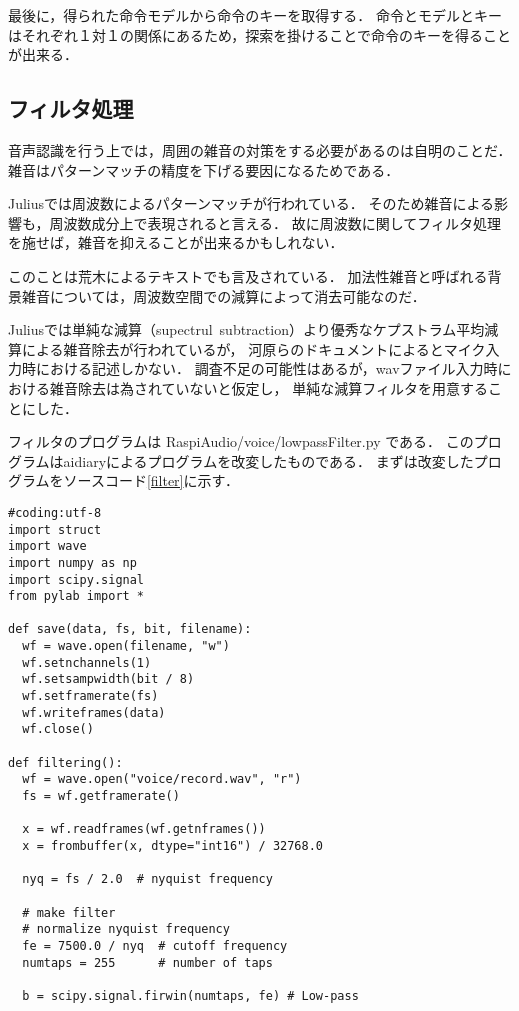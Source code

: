 \documentclass{jsarticle}
\begin{document}
\begin{multicols}{2}
最後に，得られた命令モデルから命令のキーを取得する．
命令とモデルとキーはそれぞれ１対１の関係にあるため，探索を掛けることで命令のキーを得ることが出来る．

\subsection{フィルタ処理}

音声認識を行う上では，周囲の雑音の対策をする必要があるのは自明のことだ．
雑音はパターンマッチの精度を下げる要因になるためである．

Juliusでは周波数によるパターンマッチが行われている．
そのため雑音による影響も，周波数成分上で表現されると言える．
故に周波数に関してフィルタ処理を施せば，雑音を抑えることが出来るかもしれない．

このことは荒木によるテキスト\cite{araki}でも言及されている．
加法性雑音と呼ばれる背景雑音については，周波数空間での減算によって消去可能なのだ．

Juliusでは単純な減算（supectrul\ subtraction）より優秀なケプストラム平均減算による雑音除去が行われているが，
河原らのドキュメント\cite{kawahara2}によるとマイク入力時における記述しかない．
調査不足の可能性はあるが，wavファイル入力時における雑音除去は為されていないと仮定し，
単純な減算フィルタを用意することにした．

フィルタのプログラムは
RaspiAudio/voice/lowpassFilter.py
である．
このプログラムはaidiaryによるプログラム\cite{aidiary}を改変したものである．
まずは改変したプログラムをソースコード\ref{filter}に示す．

\begin{lstlisting}[caption=RaspiAudio/voice/lowpassFilter.py,label=filter]
#coding:utf-8
import struct
import wave
import numpy as np
import scipy.signal
from pylab import *

def save(data, fs, bit, filename):
  wf = wave.open(filename, "w")
  wf.setnchannels(1)
  wf.setsampwidth(bit / 8)
  wf.setframerate(fs)
  wf.writeframes(data)
  wf.close()

def filtering():
  wf = wave.open("voice/record.wav", "r")
  fs = wf.getframerate()

  x = wf.readframes(wf.getnframes())
  x = frombuffer(x, dtype="int16") / 32768.0

  nyq = fs / 2.0  # nyquist frequency

  # make filter
  # normalize nyquist frequency
  fe = 7500.0 / nyq  # cutoff frequency
  numtaps = 255      # number of taps

  b = scipy.signal.firwin(numtaps, fe) # Low-pass


\end{lstlisting}
\end{multicols}
\end{document}
